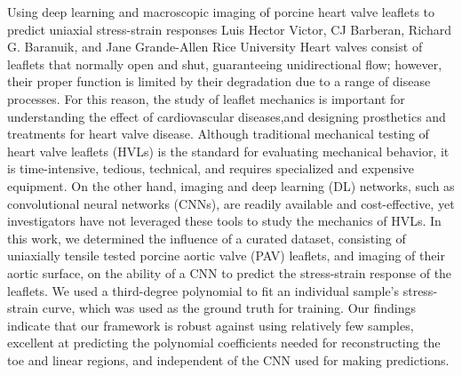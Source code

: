 \vspace{1.5ex}
\abs
{Using deep learning and macroscopic imaging of porcine heart valve leaflets to predict uniaxial stress-strain responses}
{Luis Hector Victor, CJ Barberan, Richard G. Baranuik, and Jane Grande-Allen}
{Rice University}
{Heart valves consist of leaflets that normally open and shut, guaranteeing unidirectional flow; however, their proper function is limited by their degradation due to a range of disease processes. For this reason, the study of leaflet mechanics is important for understanding the effect of cardiovascular diseases,and designing prosthetics and treatments for heart valve disease. Although traditional mechanical testing of heart valve leaflets (HVLs) is the standard for evaluating mechanical behavior, it is time-intensive, tedious, technical, and requires specialized and expensive equipment. On the other hand, imaging and deep learning (DL) networks, such as convolutional neural networks (CNNs), are readily available and cost-effective, yet investigators have not leveraged these tools to study the mechanics of HVLs. In this work, we determined the influence of a curated dataset, consisting of uniaxially tensile tested porcine aortic valve (PAV) leaflets, and imaging of their aortic surface, on the ability of a CNN to predict the stress-strain response of the leaflets. We used a third-degree polynomial to fit an individual sample's stress-strain curve, which was used as the ground truth for training. Our findings indicate that our framework is robust against using relatively few samples, excellent at predicting the polynomial coefficients needed for reconstructing the toe and linear regions, and independent of the CNN used for making predictions.}
